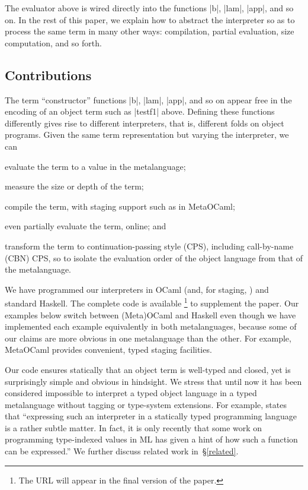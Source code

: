 \documentclass[preprint]{sigplanconf}
\begin{document}
The evaluator above is wired directly into the
functions |b|, |lam|, |app|, and so on.  In the rest of this paper, 
we explain how to abstract the interpreter so as
to process the same term in many other
ways: compilation, partial evaluation, size
computation, and so forth.

\subsection{Contributions}\label{contributions}

The term ``constructor'' functions |b|, |lam|, |app|, and so on appear
free in the encoding of an object term such as |testf1| above.  Defining
these functions differently gives rise to different interpreters, that
is, different folds on object programs.  Given the same term
representation but varying the interpreter, we can
\begin{itemize*}
    \item evaluate the term to a value in the metalanguage;
    \item measure the size or depth of the term;
    \item compile the term, with staging support such as in MetaOCaml;
    \item even partially evaluate the term, online; and
    \item transform the term to continuation\hyp passing style (CPS),
        including call-by-name (CBN) CPS, so to isolate the evaluation
        order of the object language from that of the metalanguage.
\end{itemize*}
We have programmed our interpreters in OCaml (and, for staging,
\citet{metaocaml}) and standard Haskell. The complete code is available%
\footnote{The URL will appear in the final version of the paper.}
to supplement the paper. Our examples below switch between (Meta)OCaml
and Haskell even though we have implemented each example equivalently in
both metalanguages, because some of our claims are more obvious in one
metalanguage than the other.  For example, MetaOCaml provides
convenient, typed staging facilities.

Our code ensures statically that an object term is well-typed and
closed, yet is surprisingly simple and obvious in hindsight.  We stress
that until now it has been considered impossible to
interpret a typed object language in a typed metalanguage without
tagging or type\hyp system extensions.  For example, \citet{taha-tag}
states that ``expressing such an interpreter in a statically typed
programming language is a rather subtle matter. In fact, it is only
recently that some work on programming type-indexed values in ML
\citep{yang-encoding} has given a hint of how such a function can be
expressed.''  We further discuss related work in~\S\ref{related}.
\end{document}
